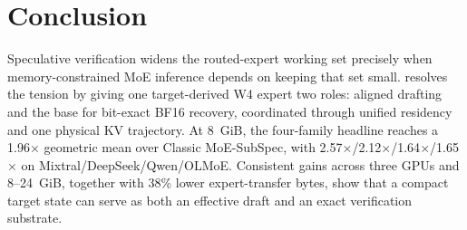 \section{Conclusion}
\label{sec:conclusion}

Speculative verification widens the routed-expert working set precisely when
memory-constrained MoE inference depends on keeping that set small. \system resolves
the tension by giving one target-derived W4 expert two roles: aligned drafting and the
base for bit-exact BF16 recovery, coordinated through unified residency and one
physical KV trajectory. At 8~GiB, the four-family headline reaches a 1.96$\times$
geometric mean over Classic MoE-SubSpec, with
2.57$\times$/2.12$\times$/1.64$\times$/1.65$\times$ on
Mixtral/DeepSeek/Qwen/OLMoE. Consistent gains across three GPUs and 8--24~GiB,
together with 38\% lower expert-transfer bytes, show that a compact target state can
serve as both an effective draft and an exact verification substrate.

